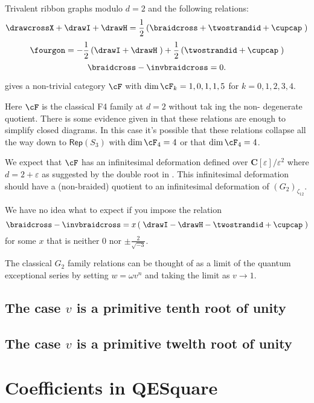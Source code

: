 \documentclass[12pt]{amsart}
\begin{document}
\begin{conjecture}
Trivalent ribbon graphs modulo $d=2$ and the following relations:
$$\drawcrossX + \drawI + \drawH = \frac{1}{2} \left(\braidcross + \twostrandid + \cupcap \;\right)$$
$$\fourgon = -\frac{1}{2} \left(\drawI + \drawH \;\right) + \frac{1}{2} \left(\twostrandid + \cupcap\;\right)$$
$$\braidcross - \invbraidcross = 0.$$

gives a non-trivial category $\cF$ with $\dim \cF_k = 1,0,1,1,5$ for $k = 0,1,2,3,4$.
\end{conjecture}

Here $\cF$ is the classical F4 family at $d=2$ without tak ing the non-
degenerate quotient.  There is some evidence given in \cite{F4E6} that these
relations are enough to simplify closed diagrams.  In this case it's possible
that these relations collapse all the way down to $\mathsf{Rep}(S_3)$ with
$\dim \cF_4 = 4$ or that $\dim \cF_4 = 4$.

\begin{remark}
We expect that $\cF$ has an infinitesimal deformation defined over
$\mathbf{C}[\varepsilon]/\varepsilon^2$ where $d = 2+\varepsilon$ as suggested
by the double root in \cite[p. 3]{F4E6}.  This infinitesimal deformation should have
a (non-braided) quotient to an infinitesimal deformation of
$(G_2)_{\zeta_{12}}$.
\end{remark}

We have no idea what to expect if you impose the relation
$$\braidcross - \invbraidcross = x \left(\;\drawI - \drawH - \twostrandid + \cupcap \; \right)$$ 
for some $x$ that is neither $0$ nor $\pm \frac{2}{\sqrt{-3}}$.

\begin{remark}
The classical $G_2$ family relations can be thought of as a limit of the quantum exceptional series by setting $w = \omega v^n$ and taking the limit as $v \rightarrow 1$.
\end{remark}


\subsection{The case \texorpdfstring{$v$}{v} is a primitive tenth root of unity}


\subsection{The case \texorpdfstring{$v$}{v} is a primitive twelth root of unity}



\appendix
\section{Coefficients in QESquare}
\label{app:coefficients}

\nn{}

\renewcommand*{\bibfont}{\small}
\setlength{\bibitemsep}{0pt}
\raggedright
\printbibliography
\end{document}
